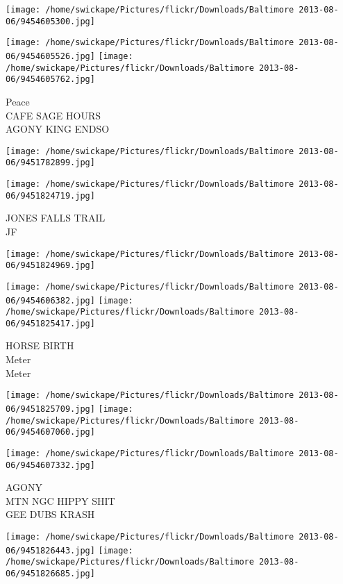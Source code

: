 \documentclass[10pt,letterpaper]{article}
\begin{document}
\texttt{[image: /home/swickape/Pictures/flickr/Downloads/Baltimore 2013-08-06/9454605300.jpg]}

\vspace{0.25in}
\texttt{[image: /home/swickape/Pictures/flickr/Downloads/Baltimore 2013-08-06/9454605526.jpg]}
\texttt{[image: /home/swickape/Pictures/flickr/Downloads/Baltimore 2013-08-06/9454605762.jpg]}

Peace\\
CAFE SAGE HOURS\\
AGONY KING ENDSO\\
\pagebreak

\texttt{[image: /home/swickape/Pictures/flickr/Downloads/Baltimore 2013-08-06/9451782899.jpg]}

\vspace{0.25in}
\texttt{[image: /home/swickape/Pictures/flickr/Downloads/Baltimore 2013-08-06/9451824719.jpg]}

JONES FALLS TRAIL\\
JF\\
\pagebreak

\texttt{[image: /home/swickape/Pictures/flickr/Downloads/Baltimore 2013-08-06/9451824969.jpg]}

\vspace{0.25in}
\texttt{[image: /home/swickape/Pictures/flickr/Downloads/Baltimore 2013-08-06/9454606382.jpg]}
\texttt{[image: /home/swickape/Pictures/flickr/Downloads/Baltimore 2013-08-06/9451825417.jpg]}

HORSE BIRTH\\
Meter\\
Meter\\
\pagebreak

\texttt{[image: /home/swickape/Pictures/flickr/Downloads/Baltimore 2013-08-06/9451825709.jpg]}
\texttt{[image: /home/swickape/Pictures/flickr/Downloads/Baltimore 2013-08-06/9454607060.jpg]}

\vspace{0.25in}
\texttt{[image: /home/swickape/Pictures/flickr/Downloads/Baltimore 2013-08-06/9454607332.jpg]}

AGONY\\
MTN NGC HIPPY SHIT\\
GEE DUBS KRASH\\
\pagebreak

\texttt{[image: /home/swickape/Pictures/flickr/Downloads/Baltimore 2013-08-06/9451826443.jpg]}
\texttt{[image: /home/swickape/Pictures/flickr/Downloads/Baltimore 2013-08-06/9451826685.jpg]}
\end{document}

